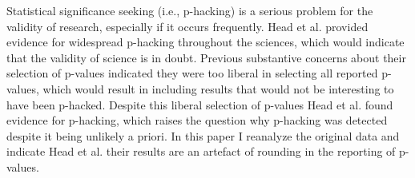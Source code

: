 Statistical significance seeking (i.e., p-hacking) is a serious problem for the validity of research, especially if it occurs frequently. Head et al. provided evidence for widespread p-hacking throughout the sciences, which would indicate that the validity of science is in doubt. Previous substantive concerns about their selection of p-values indicated they were too liberal in selecting all reported p-values, which would result in including results that would not be interesting to have been p-hacked. Despite this liberal selection of p-values Head et al. found evidence for p-hacking, which raises the question why p-hacking was detected despite it being unlikely a priori. In this paper I reanalyze the original data and indicate Head et al. their results are an artefact of rounding in the reporting of p-values.